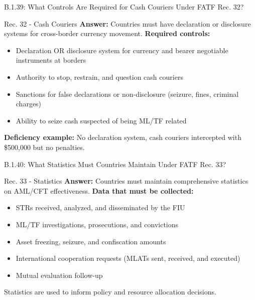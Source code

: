 \documentclass{beamer}
\begin{document}
	\begin{frame}{B.1.39: What Controls Are Required for Cash Couriers Under FATF Rec. 32?}
		\begin{block}{Rec. 32 - Cash Couriers}
			\textbf{Answer:} Countries must have declaration or disclosure systems for cross-border currency movement.
			\vspace{0.2cm}
			\textbf{Required controls:}
			\begin{itemize}
				\item Declaration OR disclosure system for currency and bearer negotiable instruments at borders
				\item Authority to stop, restrain, and question cash couriers
				\item Sanctions for false declarations or non-disclosure (seizure, fines, criminal charges)
				\item Ability to seize cash suspected of being ML/TF related
			\end{itemize}
			\textbf{Deficiency example:} No declaration system, cash couriers intercepted with \$500,000 but no penalties.
		\end{block}
	\end{frame}
	
	\begin{frame}{B.1.40: What Statistics Must Countries Maintain Under FATF Rec. 33?}
		\begin{block}{Rec. 33 - Statistics}
			\textbf{Answer:} Countries must maintain comprehensive statistics on AML/CFT effectiveness.
			\vspace{0.2cm}
			\textbf{Data that must be collected:}
			\begin{itemize}
				\item STRs received, analyzed, and disseminated by the FIU
				\item ML/TF investigations, prosecutions, and convictions
				\item Asset freezing, seizure, and confiscation amounts
				\item International cooperation requests (MLATs sent, received, and executed)
				\item Mutual evaluation follow-up
			\end{itemize}
			Statistics are used to inform policy and resource allocation decisions.
		\end{block}
	\end{frame}
	
\end{document}
